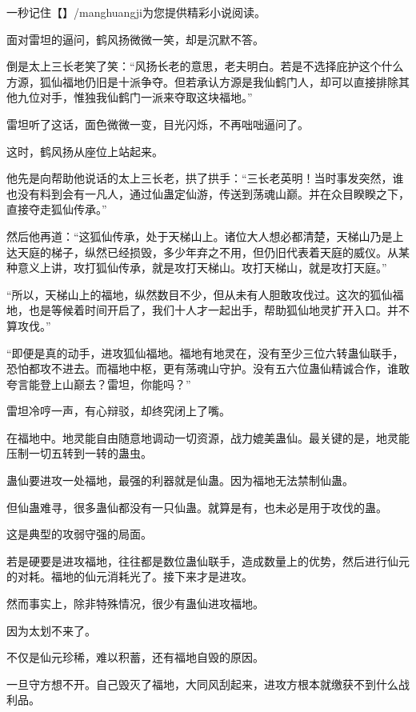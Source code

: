
\begin{this_body}

一秒记住【】/manghuangji为您提供精彩小说阅读。

面对雷坦的逼问，鹤风扬微微一笑，却是沉默不答。

倒是太上三长老笑了笑：“风扬长老的意思，老夫明白。若是不选择庇护这个什么方源，狐仙福地仍旧是十派争夺。但若承认方源是我仙鹤门人，却可以直接排除其他九位对手，惟独我仙鹤门一派来夺取这块福地。”

雷坦听了这话，面色微微一变，目光闪烁，不再咄咄逼问了。

这时，鹤风扬从座位上站起来。

他先是向帮助他说话的太上三长老，拱了拱手：“三长老英明！当时事发突然，谁也没有料到会有一凡人，通过仙蛊定仙游，传送到荡魂山巅。并在众目睽睽之下，直接夺走狐仙传承。”

然后他再道：“这狐仙传承，处于天梯山上。诸位大人想必都清楚，天梯山乃是上达天庭的梯子，纵然已经损毁，多少年弃之不用，但仍旧代表着天庭的威仪。从某种意义上讲，攻打狐仙传承，就是攻打天梯山。攻打天梯山，就是攻打天庭。”

“所以，天梯山上的福地，纵然数目不少，但从未有人胆敢攻伐过。这次的狐仙福地，也是等候着时间开启了，我们十人才一起出手，帮助狐仙地灵扩开入口。并不算攻伐。”

“即便是真的动手，进攻狐仙福地。福地有地灵在，没有至少三位六转蛊仙联手，恐怕都攻不进去。而福地中枢，更有荡魂山守护。没有五六位蛊仙精诚合作，谁敢夸言能登上山巅去？雷坦，你能吗？”

雷坦冷哼一声，有心辩驳，却终究闭上了嘴。

在福地中。地灵能自由随意地调动一切资源，战力媲美蛊仙。最关键的是，地灵能压制一切五转到一转的蛊虫。

蛊仙要进攻一处福地，最强的利器就是仙蛊。因为福地无法禁制仙蛊。

但仙蛊难寻，很多蛊仙都没有一只仙蛊。就算是有，也未必是用于攻伐的蛊。

这是典型的攻弱守强的局面。

若是硬要是进攻福地，往往都是数位蛊仙联手，造成数量上的优势，然后进行仙元的对耗。福地的仙元消耗光了。接下来才是进攻。

然而事实上，除非特殊情况，很少有蛊仙进攻福地。

因为太划不来了。

不仅是仙元珍稀，难以积蓄，还有福地自毁的原因。

一旦守方想不开。自己毁灭了福地，大同风刮起来，进攻方根本就缴获不到什么战利品。


\end{this_body}
